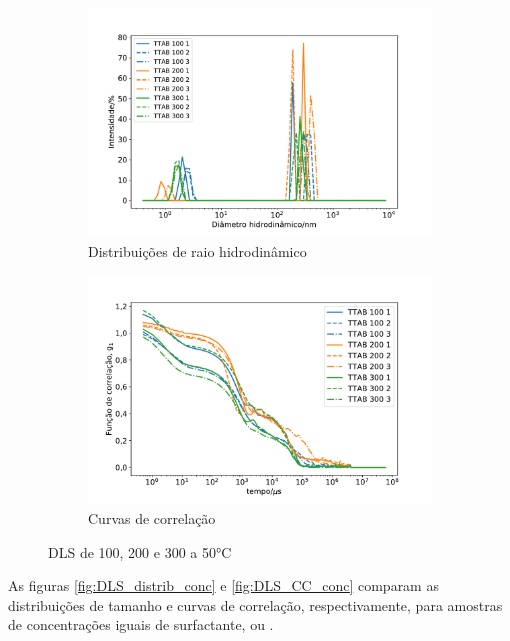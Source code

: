 \begin{figure}[h]
	\begin{subfigure}{0.47\textwidth}
		\centering
		\includegraphics[width=\textwidth]{imagens/dls/ttab_distrib}
		\caption{Distribuições de raio hidrodinâmico}
		\label{fig:DLS_ttab_distrib}
	\end{subfigure} \qquad %
	\begin{subfigure}{0.47\textwidth}
		\centering
		\includegraphics[width=\textwidth]{imagens/dls/ttab_CC}
		\caption{Curvas de correlação}
		\label{fig:DLS_ttab_cc}
	\end{subfigure}
	\caption{DLS de \TTAB{} 100, 200 e 300 \mM{} a 50°C}
	\label{fig:DLS_ttab}
\end{figure}

	As figuras \ref{fig:DLS_distrib_conc} e \ref{fig:DLS_CC_conc} comparam as distribuições de tamanho e curvas de correlação, respectivamente, para amostras de concentrações iguais de surfactante, \CTAB{} ou \TTAB.

